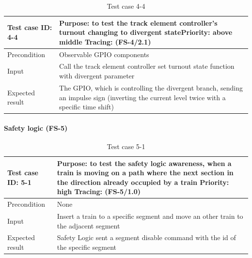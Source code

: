 \begin{table}[H]
	\caption{Test case 4-4}
	\label{table:TCase-FS4-4}
	\begin{center}
		\renewcommand{\arraystretch}{1.8}
		\begin{tabu} 
			to 0.9 \textwidth
			{  X[0.4, c] X[c] }
			\toprule
			Test case ID: 4-4 & Purpose: to test the track element controller's turnout changing to divergent state\newline Priority: above middle \newline Tracing: (FS-4/2.1)\\ \midrule
			Precondition & Observable GPIO components \\
			Input & Call the track element controller set turnout state function with divergent parameter  \\
			Expected result & The GPIO, which is controlling the divergent branch, sending an impulse sign (inverting the current level twice with a specific time shift) \\ \bottomrule
		\end{tabu}
	\end{center}
\end{table}

\paragraph{Safety logic (FS-5)}
\begin{table}[H]
	\caption{Test case 5-1}
	\label{table:TCase-FS5-1}
	\begin{center}
		\renewcommand{\arraystretch}{1.8}
		\begin{tabu} 
			to 0.9 \textwidth
			{  X[0.4, c] X[c] }
			\toprule
			Test case ID: 5-1 & Purpose: to test the safety logic awareness, when a train is moving on a path where the next section in the direction already occupied by a train \newline Priority: high \newline Tracing: (FS-5/1.0)\\ \midrule
			Precondition & None  \\
			Input & Insert a train to a specific segment and move an other train to the adjacent segment\\
			Expected result & Safety Logic sent a segment disable command with the id of the specific segment \\ \bottomrule
		\end{tabu}
	\end{center}
\end{table} 


